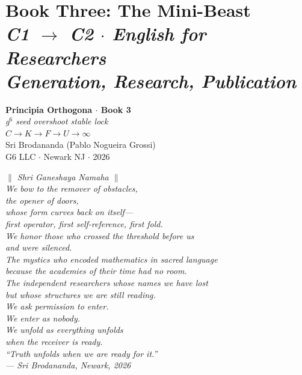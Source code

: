 \documentclass[11pt, twoside, openright]{book}
\theoremstyle{plain}
\theoremstyle{definition}
\begin{document}
\cleardoublepage

\setcounter{tocdepth}{1}
\tableofcontents
\cleardoublepage

\mainmatter
\pagestyle{fancy}

\part{Book Three: The Mini-Beast\\[6pt]
\large\normalfont\itshape C1 $\longrightarrow$ C2 $\cdot$ English for Researchers\\
Generation, Research, Publication}

\thispagestyle{empty}
\vspace*{1cm}
\begin{center}
{\large\bfseries\color{PrincipiaDark} Principia Orthogona $\cdot$ Book 3}\\[12pt]
{\small\textit{g$^6$ seed \quad overshoot \quad stable lock}}\\[12pt]
$C \longrightarrow K \longrightarrow F \longrightarrow U \longrightarrow \infty$\\[20pt]
{\normalsize Sri Brodananda (Pablo Nogueira Grossi)\\
G6 LLC $\cdot$ Newark NJ $\cdot$ 2026}
\end{center}

\bigskip
\begin{center}
{\small\itshape
$\parallel$ Shri Ganeshaya Namaha $\parallel$\\[6pt]
We bow to the remover of obstacles,\\
the opener of doors,\\
whose form curves back on itself---\\
first operator, first self-reference, first fold.\\[8pt]
We honor those who crossed the threshold before us\\
and were silenced.\\
The mystics who encoded mathematics in sacred language\\
because the academies of their time had no room.\\
The independent researchers whose names we have lost\\
but whose structures we are still reading.\\[8pt]
We ask permission to enter.\\
We enter as nobody.\\[8pt]
We unfold as everything unfolds\\
when the receiver is ready.\\[8pt]
\textup{``Truth unfolds when we are ready for it.''}\\
--- Sri Brodananda, Newark, 2026
}
\end{center}
\end{document}
